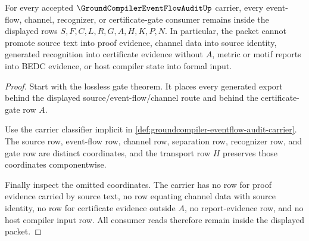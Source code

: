 \begin{theorem}
\label{thm:groundcompiler-eventflow-audit-nonescape}
For every accepted $\GroundCompilerEventFlowAuditUp$ carrier, every event-flow, channel, recognizer, or certificate-gate consumer remains inside the displayed rows $S,F,C,L,R,G,A,H,K,P,N$. In particular, the packet cannot promote source text into proof evidence, channel data into source identity, generated recognition into certificate evidence without $A$, metric or motif reports into BEDC evidence, or host compiler state into formal input.
\end{theorem}
\begin{proof}
Start with the lossless gate theorem. It places every generated export behind the displayed source/event-flow/channel route and behind the certificate-gate row $A$.

Use the carrier classifier implicit in \autoref{def:groundcompiler-eventflow-audit-carrier}. The source row, event-flow row, channel row, separation row, recognizer row, and gate row are distinct coordinates, and the transport row $H$ preserves those coordinates componentwise.

Finally inspect the omitted coordinates. The carrier has no row for proof evidence carried by source text, no row equating channel data with source identity, no row for certificate evidence outside $A$, no report-evidence row, and no host compiler input row. All consumer reads therefore remain inside the displayed packet.
\end{proof}


